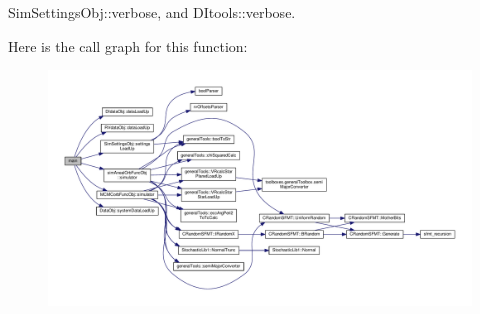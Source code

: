 Sim\-Settings\-Obj\-::verbose, and D\-Itools\-::verbose.



Here is the call graph for this function\-:
\nopagebreak
\begin{figure}[H]
\begin{center}
\leavevmode
\includegraphics[width=350pt]{looped___m_c_m_corb_simulator1_8cpp_a0ddf1224851353fc92bfbff6f499fa97_cgraph}
\end{center}
\end{figure}


